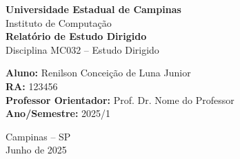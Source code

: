 \documentclass[a4paper,12pt]{article}
\begin{document}
\begin{titlepage}
    \begin{center}
        \vspace*{1cm}

        {\large \textbf{Universidade Estadual de Campinas}}\\[0.3cm]
        {\large Instituto de Computação}\\[1cm]
        {\Huge \textbf{Relatório de Estudo Dirigido}}\\[0.5cm]
        {\Large Disciplina MC032 – Estudo Dirigido}\\[5cm]

        \begin{flushright}
            \textbf{Aluno:} Renilson Conceição de Luna Junior\\
            \textbf{RA:} 123456\\
            \textbf{Professor Orientador:} Prof. Dr. Nome do Professor\\
            \textbf{Ano/Semestre:} 2025/1
        \end{flushright}

        \vfill

        Campinas – SP\\
        Junho de 2025
    \end{center}
\end{titlepage}
\end{document}
